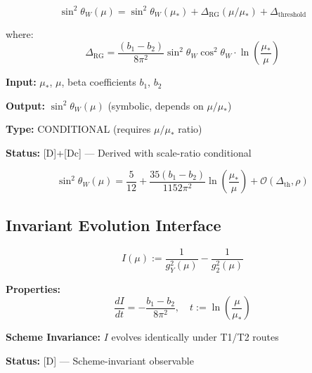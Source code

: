 \documentclass[11pt,a4paper]{article}
\theoremstyle{definition}
\begin{document}
\begin{apibox}
\begin{equation}
\label{eq:api_sw2_running}
\boxed{\sin^2\theta_W(\mu) = \sin^2\theta_W(\mu_*) + \Delta_{\text{RG}}(\mu/\mu_*) + \Delta_{\text{threshold}}}
\end{equation}

where:
\begin{equation}
\label{eq:Delta_RG_interface}
\Delta_{\text{RG}} = \frac{(b_1 - b_2)}{8\pi^2}\sin^2\theta_W\cos^2\theta_W \cdot \ln\left(\frac{\mu_*}{\mu}\right)
\end{equation}

\textbf{Input:} $\mu_*$, $\mu$, beta coefficients $b_1$, $b_2$

\textbf{Output:} $\sin^2\theta_W(\mu)$ (symbolic, depends on $\mu/\mu_*$)

\textbf{Type:} CONDITIONAL (requires $\mu/\mu_*$ ratio)

\textbf{Status:} [D]+[Dc] --- Derived with scale-ratio conditional
\end{apibox}

\begin{equation}
\label{eq:sw2_running_explicit}
\sin^2\theta_W(\mu) = \frac{5}{12} + \frac{35(b_1 - b_2)}{1152\pi^2}\ln\left(\frac{\mu_*}{\mu}\right) + \mathcal{O}(\Delta_{\text{th}}, \rho)
\end{equation}

\subsection{Invariant Evolution Interface}
\label{subsec:invariant_interface}

\begin{apibox}
\begin{equation}
\label{eq:api_invariant_I}
\boxed{I(\mu) := \frac{1}{g_Y^2(\mu)} - \frac{1}{g_2^2(\mu)}}
\end{equation}

\textbf{Properties:}
\begin{equation}
\label{eq:I_evolution}
\frac{dI}{dt} = -\frac{b_1 - b_2}{8\pi^2}, \quad t := \ln\left(\frac{\mu}{\mu_*}\right)
\end{equation}

\textbf{Scheme Invariance:} $I$ evolves identically under T1/T2 routes

\textbf{Status:} [D] --- Scheme-invariant observable
\end{apibox}
\end{document}
